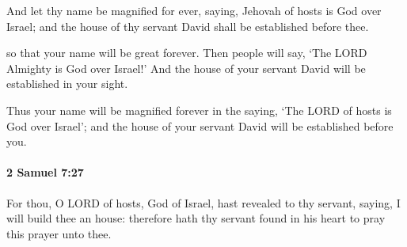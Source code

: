 			\begin{versebox}
					\item[BHS] 
					\item[ASV] And let thy name be magnified for ever, saying, Jehovah of hosts is God over Israel; and the house of thy servant David shall be established before thee.
					\item[NIV] so that your name will be great forever. Then people will say, ‘The LORD Almighty is God over Israel!’ And the house of your servant David will be established in your sight.
					\item[NRSV] Thus your name will be magnified forever in the saying, ‘The LORD of hosts is God over Israel’; and the house of your servant David will be established before you.
			\end{versebox}

		\paragraph{2 Samuel 7:27} %
			\label{2SAMUEL-7-27}

			For thou, O LORD of hosts, God of Israel, hast revealed to thy servant, saying, I will build thee an house: therefore hath thy servant found in his heart to pray this prayer unto thee.

